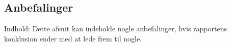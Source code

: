 \subsection{Anbefalinger}
Indhold: Dette afsnit kan indeholde nogle anbefalinger, hvis rapportens konklusion ender med at lede frem til nogle.